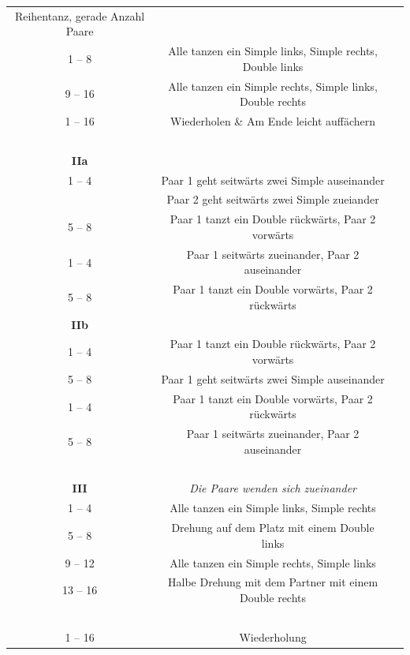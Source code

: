 \documentclass[
	12pt,
	]{scrartcl}
\newif\iffast
\newcommand{\danceinfo}[1]{%
	{\raggedleft\footnotesize{#1}\par}
}
\newcommand{\dancename}[1]{
	\begin{tikzpicture}[remember picture, overlay]
		\node[anchor=north, yshift=-0.5cm, inner sep=0, text width=10.5cm, align=center] at (current page.north){\Huge{#1}};
	\end{tikzpicture}
}
\newcommand{\dancedifficultmarker}{
	\iffast
	\else
		\begin{tikzpicture}[remember picture, overlay]
			\node[anchor=south, xshift=0cm, yshift=0.4cm, inner sep=0] at (current page.south){\pgfornament[width=5cm]{84}};
		\end{tikzpicture}
	\fi
}
\newcommand{\danceinstructionsbegin}{\begin{longtable}{p{1cm}p{9.8cm}}}
\newcommand{\danceinstructionsel}{~ & ~ \\}
\begin{document}
\begin{longtable}{c | c | c}
\newpage

\dancename{Pavane La Battaglia}
%
\danceinfo{Reihentanz, gerade Anzahl Paare}
\danceinstructionsbegin
\textbf{I}&\\
1 -- 8 		& Alle tanzen ein Simple links, Simple rechts, Double links\\
9 -- 16		& Alle tanzen ein Simple rechts, Simple links, Double rechts\\
1 -- 16		& Wiederholen \& Am Ende leicht auffächern\\
\danceinstructionsel
\textbf{IIa}&\\
1 -- 4 		& Paar 1 geht seitwärts zwei Simple auseinander\\
& Paar 2 geht seitwärts zwei Simple zueiander\\
5 -- 8 		& Paar 1 tanzt ein Double rückwärts, Paar 2 vorwärts\\
1 -- 4 		& Paar 1 seitwärts zueinander, Paar 2 auseinander\\
5 -- 8 		& Paar 1 tanzt ein Double vorwärts, Paar 2 rückwärts\\
\textbf{IIb}&\\
1 -- 4 		& Paar 1 tanzt ein Double rückwärts, Paar 2 vorwärts\\
5 -- 8 		& Paar 1 geht seitwärts zwei Simple auseinander\\
1 -- 4 		& Paar 1 tanzt ein Double vorwärts, Paar 2 rückwärts\\
5 -- 8 		& Paar 1 seitwärts zueinander, Paar 2 auseinander\\
\danceinstructionsel
\textbf{III} & \textit{Die Paare wenden sich zueinander}\\
1 -- 4 		& Alle tanzen ein Simple links, Simple rechts\\
5 -- 8 		& Drehung auf dem Platz mit einem Double links\\
9 -- 12 	& Alle tanzen ein Simple rechts, Simple links\\
13 -- 16 	& Halbe Drehung mit dem Partner mit einem Double rechts\\
\danceinstructionsel
1 -- 16 	& Wiederholung\\

\end{longtable}
\end{document}
